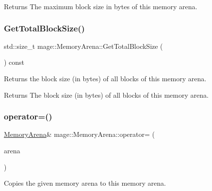 \begin{DoxyReturn}{Returns}
The maximum block size in bytes of this memory arena. 
\end{DoxyReturn}
\mbox{\label{classmage_1_1_memory_arena_a0a5d4de92cb900d8e190eba28deed2dc}} 
\subsubsection{\texorpdfstring{Get\+Total\+Block\+Size()}{GetTotalBlockSize()}}
{\footnotesize\ttfamily std\+::size\+\_\+t mage\+::\+Memory\+Arena\+::\+Get\+Total\+Block\+Size (\begin{DoxyParamCaption}{ }\end{DoxyParamCaption}) const\hspace{0.3cm}{\ttfamily [noexcept]}}

Returns the block size (in bytes) of all blocks of this memory arena.

\begin{DoxyReturn}{Returns}
The block size (in bytes) of all blocks of this memory arena. 
\end{DoxyReturn}
\mbox{\label{classmage_1_1_memory_arena_a7e7799f859c55435714933972ecb8b95}} 
\subsubsection{\texorpdfstring{operator=()}{operator=()}\hspace{0.1cm}{\footnotesize\ttfamily [1/2]}}
{\footnotesize\ttfamily \mbox{\hyperlink{classmage_1_1_memory_arena}{Memory\+Arena}}\& mage\+::\+Memory\+Arena\+::operator= (\begin{DoxyParamCaption}\item[{const \mbox{\hyperlink{classmage_1_1_memory_arena}{Memory\+Arena}} \&}]{arena }\end{DoxyParamCaption})\hspace{0.3cm}{\ttfamily [delete]}}

Copies the given memory arena to this memory arena.


